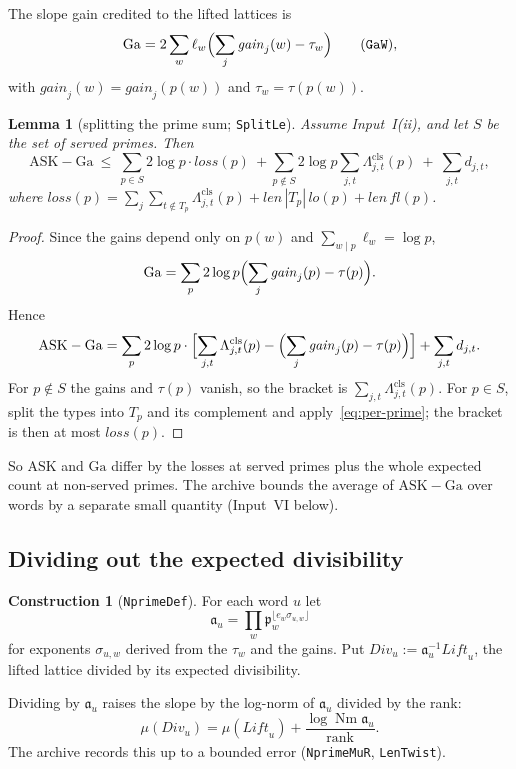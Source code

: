 \documentclass[11pt]{amsart}
\newtheorem{lemma}[theorem]{Lemma}
\theoremstyle{definition}
\newtheorem{construction}[theorem]{Construction}
\theoremstyle{remark}
\newcommand{\len}{\mathit{len}}
\DeclareMathOperator{\Nm}{Nm}
\newcommand{\ASK}{\mathrm{ASK}}
\begin{document}
The slope gain credited to the lifted lattices is
\[
\mathrm{Ga}=2\sum_w\ell_w\Bigl(\sum_j\mathit{gain}_j(w)-\tau_w\Bigr)\qquad(\texttt{GaW}),
\]
with $\mathit{gain}_j(w)=\mathit{gain}_j(p(w))$ and $\tau_w=\tau(p(w))$.

\begin{lemma}[splitting the prime sum; \texttt{SplitLe}]\label{lem:split}
Assume Input~I(ii), and let $S$ be the set of served primes. Then
\[
\ASK-\mathrm{Ga}\ \le\ \sum_{p\in S}2\log p\cdot\mathit{loss}(p)\ +\sum_{p\notin S}2\log p\sum_{j,t}\Lambda^{\mathrm{cls}}_{j,t}(p)\ +\ \sum_{j,t}d_{j,t},
\]
where $\mathit{loss}(p)=\sum_j\sum_{t\notin T_p}\Lambda^{\mathrm{cls}}_{j,t}(p)+\len\,|T_p|\,\mathit{lo}(p)+\len\,\mathit{fl}(p)$.
\end{lemma}

\begin{proof}
Since the gains depend only on $p(w)$ and $\sum_{w\mid p}\ell_w=\log p$,
\[
\mathrm{Ga}=\sum_p2\log p\Bigl(\sum_j\mathit{gain}_j(p)-\tau(p)\Bigr).
\]
Hence
\[
\ASK-\mathrm{Ga}=\sum_p2\log p\cdot\Bigl[\sum_{j,t}\Lambda^{\mathrm{cls}}_{j,t}(p)-\Bigl(\sum_j\mathit{gain}_j(p)-\tau(p)\Bigr)\Bigr]+\sum_{j,t}d_{j,t}.
\]
For $p\notin S$ the gains and $\tau(p)$ vanish, so the bracket is $\sum_{j,t}\Lambda^{\mathrm{cls}}_{j,t}(p)$. For $p\in S$, split the types into $T_p$ and its complement and apply~\eqref{eq:per-prime}; the bracket is then at most $\mathit{loss}(p)$.
\end{proof}

So $\ASK$ and $\mathrm{Ga}$ differ by the losses at served primes plus the whole expected count at non-served primes. The archive bounds the average of $\ASK-\mathrm{Ga}$ over words by a separate small quantity (Input~VI below).

\subsection{Dividing out the expected divisibility}
\begin{construction}[\texttt{NprimeDef}]
For each word $u$ let
\[
\mathfrak a_u=\prod_w\mathfrak p_w^{\lfloor e_w\sigma_{u,w}\rfloor}
\]
for exponents $\sigma_{u,w}$ derived from the $\tau_w$ and the gains. Put $\mathit{Div}_u:=\mathfrak a_u^{-1}\mathit{Lift}_u$, the lifted lattice divided by its expected divisibility.
\end{construction}

Dividing by $\mathfrak a_u$ raises the slope by the log-norm of $\mathfrak a_u$ divided by the rank:
\[
\mu(\mathit{Div}_u)=\mu(\mathit{Lift}_u)+\frac{\log\Nm\mathfrak a_u}{\mathrm{rank}}.
\]
The archive records this up to a bounded error (\texttt{NprimeMuR}, \texttt{LenTwist}).
\end{document}
